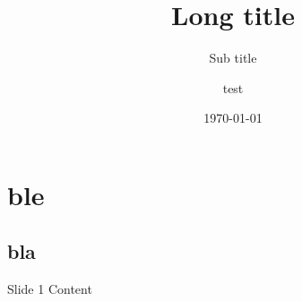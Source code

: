 \documentclass[hyperref={pdftex}]{beamer}
\title[Short Title]{Long title}
\subtitle{Sub title}
\date{\today}
\author{test}
\begin{document}
    \begin{titlepage}
    \end{titlepage}

\section{ble}
\subsection{bla}
    \begin{frame}{Slide 1}
          Content
    \end{frame}
\end{document}
